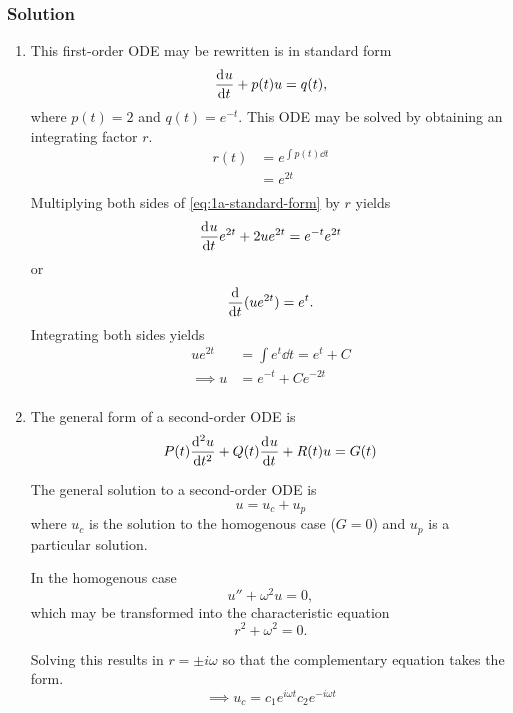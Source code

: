\documentclass[12pt]{article}
\begin{document}
\subsubsection*{Solution}
\begin{enumerate}
\item This first-order ODE may be rewritten is in standard form
  \begin{equation}
    \label{eq:1a-standard-form}
    \od{u}{t} + p(t)u = q(t),
  \end{equation}
  where $p(t)=2$ and $q(t)=e^{-t}$. This ODE may be solved by obtaining an
  integrating factor $r$.
  \begin{equation*}
    \label{eq:1a-integrating-factor}
    \begin{aligned}
      r(t) &= e^{\int p(t) \dd{t}} \\
      &=e^{2t} \\
    \end{aligned}
  \end{equation*}
  Multiplying both sides of \cref{eq:1a-standard-form} by $r$ yields
  $$\od{u}{t} e^{2t} + 2u e^{2t} = e^{-t} e^{2t}$$
  or 
  $$\od{}{t}(u e^{2t}) = e^{t}.$$
  Integrating both sides yields
  \begin{equation} \boxed{
    \begin{aligned}
      u e^{2t} &= \int e^{t}\dd{t} = e^{t} + C \\
      \implies u &= e^{-t} + C e^{-2t} \\
    \end{aligned}
    }
  \end{equation}

\item The general form of a second-order ODE is
  $$P(t)\od[2]{u}{t} + Q(t)\od{u}{t} + R(t)u = G(t)$$

  The general solution to a second-order ODE is $$u = u_c + u_p$$ where $u_c$ is
  the solution to the homogenous case ($G=0$) and $u_p$ is a particular
  solution.

  In the homogenous case
  $$u''+\omega^2u=0,$$
  which may be transformed into the characteristic equation
  $$r^2+\omega^2=0.$$

  Solving this results in $r=\pm i\omega$ so that the complementary equation
  takes the form.
  \begin{equation}
    \label{eq:1n-hom-sol}
    \implies u_c = c_1e^{i\omega t}c_2e^{-i\omega t}
  \end{equation}


\end{enumerate}
\end{document}
